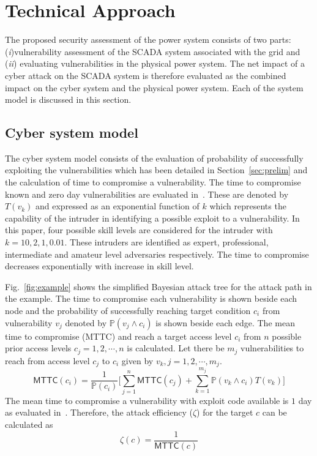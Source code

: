 \section{Technical Approach}\label{sec:technical}
The proposed security assessment of the power system consists of two parts: (\textit{i})vulnerability assessment of the SCADA system associated with the grid and (\textit{ii}) evaluating vulnerabilities in the physical power system. The net impact of a cyber attack on the SCADA system is therefore evaluated as the combined impact on the cyber system and the physical power system. Each of the system model is discussed in this section.
\subsection{Cyber system model}\label{sec:cyber}
The cyber system model consists of the evaluation of probability of successfully exploiting the vulnerabilities which has been detailed in Section~\ref{sec:prelim} and the calculation of time to compromise a vulnerability. The time to compromise known and zero day vulnerabilities are evaluated in~\cite{mcqueen}. These are denoted by $T(v_k)$ and expressed as an exponential function of $k$ which represents the capability of the intruder in identifying a possible exploit to a vulnerability. In this paper, four possible skill levels are considered for the intruder with $k=10,2,1,0.01$. These intruders are identified as expert, professional, intermediate and amateur level adversaries respectively. The time to compromise decreases exponentially with increase in skill level.
 
Fig.~\ref{fig:example} shows the simplified Bayesian attack tree    for the attack path in the example. The time to compromise each vulnerability is shown beside each node and the probability of successfully reaching target condition $c_i$ from vulnerability $v_j$ denoted by $\mathbb{P}(v_j\wedge c_i)$ is shown beside each edge. The mean time to compromise (MTTC) and reach a target access level $c_i$ from $n$ possible prior access levels $c_j=1,2,\cdots,n$ is calculated. Let there be $m_j$ vulnerabilities to reach from access level $c_j$ to $c_i$ given by $v_k,j=1,2,\cdots,m_j$.
\begin{equation}
\mathsf{MTTC}(c_i)=\dfrac{1}{\mathbb{P}(c_i)}\bigg[\sum_{j=1}^{n}\mathsf{MTTC}(c_j)+\sum_{k=1}^{m_j}{\mathbb{P}(v_k\wedge c_i)T(v_k)}\bigg]
\end{equation}
The mean time to compromise a vulnerability with exploit code available is $1$ day as evaluated in~\cite{mcqueen}. Therefore, the attack efficiency ($\zeta$) for the target $c$ can be calculated as 
\begin{equation}
\zeta(c)=\dfrac{1}{\mathsf{MTTC}(c)}
\end{equation}

